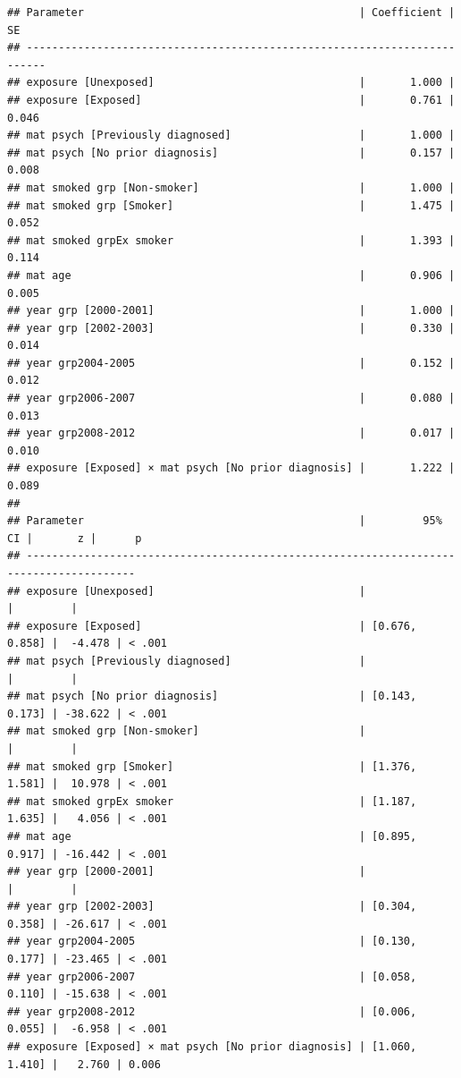 \documentclass[
]{article}
\begin{document}
\begin{verbatim}
## Parameter                                           | Coefficient |    SE
## -------------------------------------------------------------------------
## exposure [Unexposed]                                |       1.000 |      
## exposure [Exposed]                                  |       0.761 | 0.046
## mat psych [Previously diagnosed]                    |       1.000 |      
## mat psych [No prior diagnosis]                      |       0.157 | 0.008
## mat smoked grp [Non-smoker]                         |       1.000 |      
## mat smoked grp [Smoker]                             |       1.475 | 0.052
## mat smoked grpEx smoker                             |       1.393 | 0.114
## mat age                                             |       0.906 | 0.005
## year grp [2000-2001]                                |       1.000 |      
## year grp [2002-2003]                                |       0.330 | 0.014
## year grp2004-2005                                   |       0.152 | 0.012
## year grp2006-2007                                   |       0.080 | 0.013
## year grp2008-2012                                   |       0.017 | 0.010
## exposure [Exposed] × mat psych [No prior diagnosis] |       1.222 | 0.089
## 
## Parameter                                           |         95% CI |       z |      p
## ---------------------------------------------------------------------------------------
## exposure [Unexposed]                                |                |         |       
## exposure [Exposed]                                  | [0.676, 0.858] |  -4.478 | < .001
## mat psych [Previously diagnosed]                    |                |         |       
## mat psych [No prior diagnosis]                      | [0.143, 0.173] | -38.622 | < .001
## mat smoked grp [Non-smoker]                         |                |         |       
## mat smoked grp [Smoker]                             | [1.376, 1.581] |  10.978 | < .001
## mat smoked grpEx smoker                             | [1.187, 1.635] |   4.056 | < .001
## mat age                                             | [0.895, 0.917] | -16.442 | < .001
## year grp [2000-2001]                                |                |         |       
## year grp [2002-2003]                                | [0.304, 0.358] | -26.617 | < .001
## year grp2004-2005                                   | [0.130, 0.177] | -23.465 | < .001
## year grp2006-2007                                   | [0.058, 0.110] | -15.638 | < .001
## year grp2008-2012                                   | [0.006, 0.055] |  -6.958 | < .001
## exposure [Exposed] × mat psych [No prior diagnosis] | [1.060, 1.410] |   2.760 | 0.006
\end{verbatim}
\end{document}
